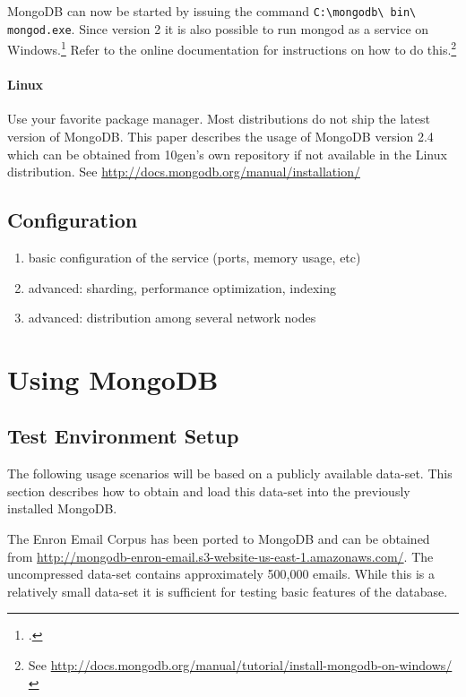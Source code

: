 MongoDB can now be started by issuing the command \texttt{C:\textbackslash mongodb\textbackslash\- bin\textbackslash\- mongod.exe}.
Since version 2 it is also possible to run mongod as a service on Windows.\footcite[Cf.][]{mongo_install_win} Refer
to the online documentation for instructions on how to do 
this.\footnote{See \url{http://docs.mongodb.org/manual/tutorial/install-mongodb-on-windows/}}

\paragraph{Linux}
\label{sec:installation-linux}
Use your favorite package manager.
Most distributions do not ship the latest version of MongoDB. This paper describes the usage of
MongoDB version 2.4 which can be obtained from 10gen's own repository if not available in the
Linux distribution. See \url{http://docs.mongodb.org/manual/installation/}

\subsection{Configuration}
\label{sec:configuration}

\begin{enumerate}
  \item basic configuration of the service (ports, memory usage, etc)
  \item advanced: sharding, performance optimization, indexing
  \item advanced: distribution among several network nodes
\end{enumerate}
    
    
\newpage
\section{Using MongoDB}
\label{sec:usage}

\subsection{Test Environment Setup}
\label{sec:test-environment}

The following usage scenarios will be based on a publicly available data-set.
This section describes how to obtain and load this data-set into the previously
installed MongoDB.

The Enron Email Corpus has been ported to MongoDB and can be obtained from
\url{http://mongodb-enron-email.s3-website-us-east-1.amazonaws.com/}.
The uncompressed data-set contains approximately 500,000 emails.
While this is a relatively small data-set it is sufficient for
testing basic features of the database.


